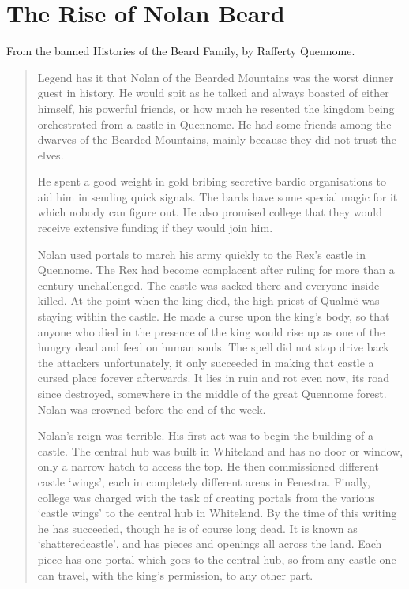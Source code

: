 \section{The Rise of Nolan Beard}
\label{nolan}

\begin{multicols}{2}

\noindent From the banned Histories of the Beard Family, by Rafferty Quennome.

\begin{quotation}

	Legend has it that Nolan of the Bearded Mountains was the worst dinner guest in history.
	He would spit as he talked and always boasted of either himself, his powerful friends, or how much he resented the kingdom being orchestrated from a castle in Quennome.
	He had some friends among the dwarves of the Bearded Mountains, mainly because they did not trust the elves.

	He spent a good weight in gold bribing secretive bardic organisations to aid him in sending quick signals.
	The bards have some special magic for it which nobody can figure out.
	He also promised \gls{college} that they would receive extensive funding if they would join him.

	Nolan used portals to march his army quickly to the Rex's castle in Quennome.
	The Rex had become complacent after ruling for more than a century unchallenged.
	The castle was sacked there and everyone inside killed.
	At the point when the king died, the high priest of Qualm\"{e} was staying within the castle.
	He made a curse upon the king's body, so that anyone who died in the presence of the king would rise up as one of the hungry dead and feed on human souls.
	The spell did not stop drive back the attackers unfortunately, it only succeeded in making that castle a cursed place forever afterwards.
	It lies in ruin and rot even now, its road since destroyed, somewhere in the middle of the great Quennome forest.
	Nolan was crowned before the end of the week.

	Nolan's reign was terrible.
	His first act was to begin the building of a castle.
	The central hub was built in Whiteland and has no door or window, only a narrow hatch to access the top.
	He then commissioned different castle `wings', each in completely different areas in Fenestra.
	Finally, \gls{college} was charged with the task of creating portals from the various `castle wings' to the central hub in Whiteland.
	By the time of this writing he has succeeded, though he is of course long dead.
	It is known as `\gls{shatteredcastle}', and has pieces and openings all across the land.
	Each piece has one portal which goes to the central hub, so from any castle one can travel, with the king's permission, to any other part.


\end{quotation}
\end{multicols}
